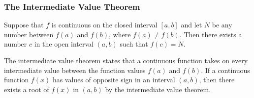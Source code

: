 \subsubsection*{The Intermediate Value Theorem}
\begin{theorem}
    Suppose that \(f\) is continuous on the closed interval \([a,b]\) and let
    \(N\) be any number between \(f(a)\) and \(f(b)\),
    where \(f(a)\neq f(b)\).
    Then there exists a number \(c\) in the open interval \((a,b)\) such that
    \(f(c)=N\).
\end{theorem}
The intermediate value theorem states that a continuous function takes on
every intermediate value between the function values \(f(a)\) and \(f(b)\).
If a continuous function \(f(x)\) has values of opposite sign in an interval
\((a,b)\), then there exists a root of \(f(x)\) in \((a,b)\) by the
intermediate value theorem.
